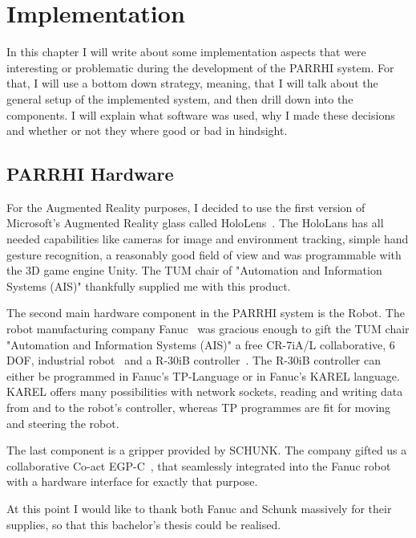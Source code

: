 \chapter{Implementation}\label{Chap:Implementation}

In this chapter I will write about some implementation aspects that were interesting or problematic during the development of the PARRHI system. For that, I will use a bottom down strategy, meaning, that I will talk about the general setup of the implemented system, and then drill down into the components. I will explain what software was used, why I made these decisions and whether or not they where good or bad in hindsight.

\section{PARRHI Hardware}
For the Augmented Reality purposes, I decided to use the first version of Microsoft's Augmented Reality glass called HoloLens~\cite{HoloLens}. The HoloLans has all needed capabilities like cameras for image and environment tracking, simple hand gesture recognition, a reasonably good field of view and was programmable with the 3D game engine Unity. The TUM chair of "Automation and Information Systems (AIS)" thankfully supplied me with this product.

The second main hardware component in the PARRHI system is the Robot. The robot manufacturing company Fanuc~\cite{Fanuc} was gracious enough to gift the TUM chair "Automation and Information Systems (AIS)" a free CR-7iA/L collaborative, 6 DOF, industrial robot~\cite{FanucCR7} and a R-30iB controller~\cite{FanucR30iB}. The R-30iB controller can either be programmed in Fanuc's TP-Language or in Fanuc's KAREL language. KAREL offers many possibilities with network sockets, reading and writing data from and to the robot's controller, whereas TP programmes are fit for moving and steering the robot.

The last component is a gripper provided by SCHUNK. The company gifted us a collaborative Co-act EGP-C~\cite{SchunkGripper}, that seamlessly integrated into the Fanuc robot with a hardware interface for exactly that purpose. 

At this point I would like to thank both Fanuc and Schunk massively for their supplies, so that this bachelor's thesis could be realised.

